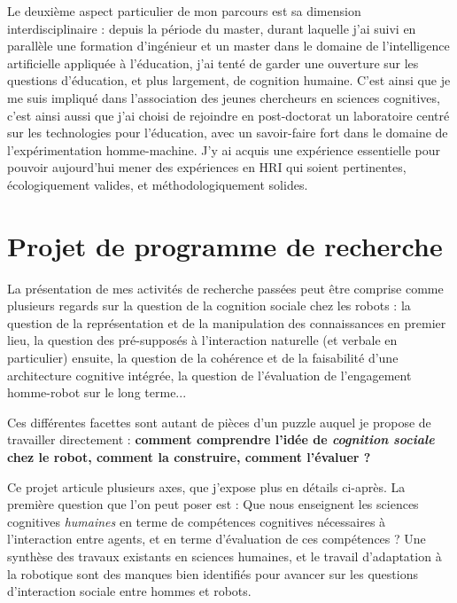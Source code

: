 \documentclass[a4paper]{article}
\begin{document}
Le deuxième aspect particulier de mon parcours est sa dimension
interdisciplinaire : depuis la période du master, durant laquelle j'ai suivi en
parallèle une formation d'ingénieur et un master dans le domaine de
l'intelligence artificielle appliquée à l'éducation, j'ai tenté de garder une
ouverture sur les questions d'éducation, et plus largement, de cognition
humaine. C'est ainsi que je me suis impliqué dans l'association des jeunes
chercheurs en sciences cognitives, c'est ainsi aussi que j'ai choisi de
rejoindre en post-doctorat un laboratoire centré sur les technologies pour
l'éducation, avec un savoir-faire fort dans le domaine de l'expérimentation
homme-machine. J'y ai acquis une expérience essentielle pour pouvoir aujourd'hui
mener des expériences en HRI qui soient pertinentes, écologiquement valides, et
méthodologiquement solides.

\printbibliography



\section{Projet de programme de recherche}
\newrefsection

La présentation de mes activités de recherche passées peut être comprise comme
plusieurs regards sur la question de la cognition sociale chez les robots : la
question de la représentation et de la manipulation des connaissances en premier
lieu, la question des pré-supposés à l'interaction naturelle (et verbale en
particulier) ensuite, la question de la cohérence et de la faisabilité d'une
architecture cognitive intégrée, la question de l'évaluation de l'engagement
homme-robot sur le long terme...

Ces différentes facettes sont autant de pièces d'un puzzle auquel je propose de
travailler directement : \textbf{comment comprendre l'idée de \emph{cognition
sociale} chez le robot, comment la construire, comment l'évaluer ?}

Ce projet articule plusieurs axes, que j'expose plus en détails ci-après. La
première question que l'on peut poser est : Que nous enseignent les sciences
cognitives \emph{humaines} en terme de compétences cognitives nécessaires à
l'interaction entre agents, et en terme d'évaluation de ces compétences ? Une
synthèse des travaux existants en sciences humaines, et le travail d'adaptation
à la robotique sont des manques bien identifiés pour avancer sur les questions
d'interaction sociale entre hommes et robots.
\end{document}

